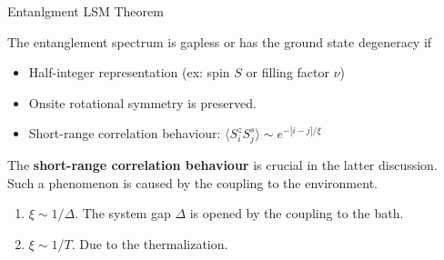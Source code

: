 \documentclass[professionalfont]{beamer}
\theoremstyle{definition}
\newcommand{\anglelr}[1]{\langle#1\rangle}
\begin{document}
\begin{frame}{Entanlgment LSM Theorem}
    \begin{theorem}
        The entanglement spectrum is gapless or has the ground state degeneracy if
        \begin{itemize}
            \item Half-integer representation (ex: spin $S$ or filling factor $\nu$)
            \item Onsite rotational symmetry is preserved.
            \item Short-range correlation behaviour: $\anglelr{S^z_iS^s_j}\sim e^{-|i-j|/\xi}$
        \end{itemize}
    \end{theorem}
    The \textbf{short-range correlation behaviour} is crucial in the latter discussion. Such a phenomenon is caused by the coupling to the environment.
    \begin{enumerate}
        \item $\xi\sim1/\Delta$. The system gap $\Delta$ is opened by the coupling to the bath.
        \item $\xi\sim1/T$. Due to the thermalization.
    \end{enumerate}
\end{frame}
\end{document}
